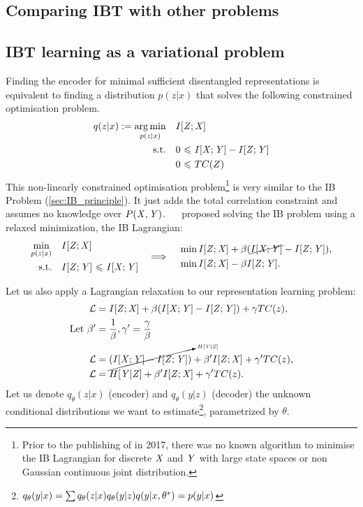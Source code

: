 \subsection{Comparing IBT with other problems}
\subsection{IBT learning as a variational problem}
    Finding the encoder for minimal sufficient disentangled representations is equivalent to finding a distribution $p(z|x)$ that solves the following constrained optimisation problem.
    \begin{align}
        q(z|x):=\underset{p(z|x)}{\operatorname*{arg\,min}} \quad  & I[{{\mathit{Z}}};{{\mathit{X}}}]  \\
        \textrm{s.t.}\quad
        & 0 {~\leqslant ~} I[{{\mathit{X}}};{{\mathit{Y}}}] - I[{{\mathit{Z}}};{{\mathit{Y}}}] \nonumber\\
        \quad & 0 {~\leqslant ~} TC(Z)\nonumber
    \end{align}
    This non-linearly constrained optimisation problem\footnote{Prior to the publishing of  in 2017, there was no known algorithm to minimise the IB Lagrangian for discrete ${\mathit{X}}$ and ${\mathit{Y}}$ with large state spaces or non Gaussian continuous joint distribution.} is very similar to the IB Problem (\cref{sec:IB_principle}). It just adds the total correlation constraint and assumes no knowledge over $P({\mathit{X}},{\mathit{Y}})$. ~\citeauthor{tishby:1999}~\cite{tishby:1999} proposed solving the IB problem using a relaxed minimization, the IB Lagrangian:
    \begin{equation}
        \begin{split}
        \underset{p(z|x)}{\min} \quad  & I[{{\mathit{Z}}};{{\mathit{X}}}]  \\
        \textrm{s.t.}\quad & I[{{\mathit{Z}}};{{\mathit{Y}}}] {~\leqslant ~} I[{{\mathit{X}}};{{\mathit{Y}}}] \\
        \end{split}
        \quad \Longrightarrow \quad
        \begin{split}
            &\min I[{{\mathit{Z}}};{{\mathit{X}}}] + \beta (\cancel{I[{{\mathit{X}}};{{\mathit{Y}}}]} - I[{{\mathit{Z}}};{{\mathit{Y}}}]),\\
            &\min I[{{\mathit{Z}}};{{\mathit{X}}}] - \beta I[{{\mathit{Z}}};{{\mathit{Y}}}].
        \end{split}
    \end{equation}

    Let us also apply a Lagrangian relaxation to our representation learning problem:
    \begin{align}
        \mathcal{L} &=  I[{{\mathit{Z}}};{{\mathit{X}}}] + \beta (I[{{\mathit{X}}};{{\mathit{Y}}}] - I[{{\mathit{Z}}};{{\mathit{Y}}}]) + \gamma TC(z),\\
        \text{Let }\beta'&= \frac{1}{\beta}, \gamma'= \frac{\gamma}{\beta}\\
        \mathcal{L} &=  \cancelto{\scriptscriptstyle H[{{\mathit{Y}}}|{{\mathit{Z}}}]}{(I[{{\mathit{X}}};{{\mathit{Y}}}] - I[{{\mathit{Z}}};{{\mathit{Y}}}])} + \beta' I[{{\mathit{Z}}};{{\mathit{X}}}] + \gamma' TC(z),\\
        \mathcal{L} &=  H[{{\mathit{Y}}}|{{\mathit{Z}}}] + \beta' I[{{\mathit{Z}}};{{\mathit{X}}}] + \gamma' TC(z).
    \end{align}
    Let us denote $q_\theta(z|x)$ (encoder) and $q_\theta(y|z)$ (decoder) the unknown conditional distributions we want to estimate\footnote{$q_\theta(y|x)=\sum q_\theta(z|x) q_\theta(y|z)\\q(y|x,\theta^*)=p(y|x)$
    }, parametrized by $\theta$.

